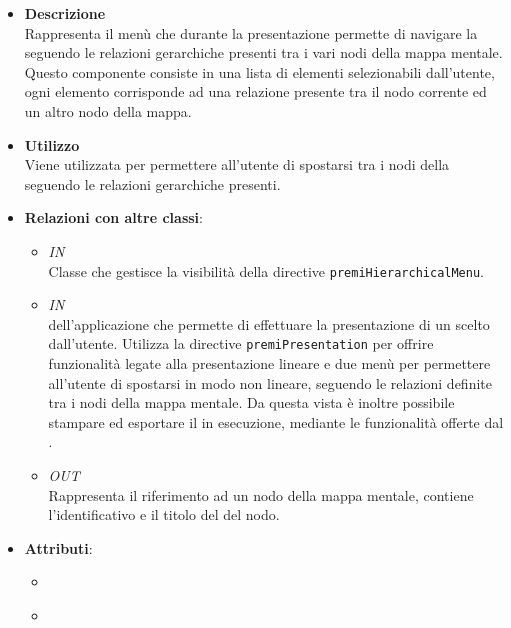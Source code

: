 \FloatBarrier
\begin{itemize}
\item \textbf{Descrizione}\\
Rappresenta il menù che durante la presentazione permette di navigare la  seguendo le relazioni gerarchiche presenti tra i vari nodi della mappa mentale. Questo componente consiste in una lista di elementi selezionabili dall’utente, ogni elemento corrisponde ad una relazione presente tra il nodo corrente ed un altro nodo della mappa.
\item \textbf{Utilizzo}\\
Viene utilizzata per permettere all'utente di spostarsi tra i nodi della  seguendo le relazioni gerarchiche presenti.
\item \textbf{Relazioni con altre classi}:
\begin{itemize}
\item \textit{IN} \hyperref[\nogloxy{Premi::Front-End::Controllers::HierarchicalMenuController}]{}\\
Classe che gestisce la visibilità della directive \texttt{premiHierarchicalMenu}.
\item \textit{IN} \hyperref[\nogloxy{Premi::Front-End::Views::PresentationView}]{}\\
 dell’applicazione che permette di effettuare la presentazione di un  scelto dall’utente. Utilizza la directive \texttt{premiPresentation} per offrire funzionalità legate alla presentazione lineare e due menù per permettere all'utente di spostarsi in modo non lineare, seguendo le relazioni definite tra i nodi della mappa mentale.
Da questa vista è inoltre possibile stampare ed esportare il  in esecuzione, mediante le funzionalità offerte dal .
\item \textit{OUT} \hyperref[\nogloxy{Premi::Front-End::Model::NodeReference}]{}\\
Rappresenta il riferimento ad un nodo della mappa mentale, contiene l'identificativo e il titolo del del nodo.
\end{itemize}
\item \textbf{Attributi}:
\begin{itemize}
\item {}
\\ \dpDirectiveController
\item {}

\end{itemize}
\end{itemize}
